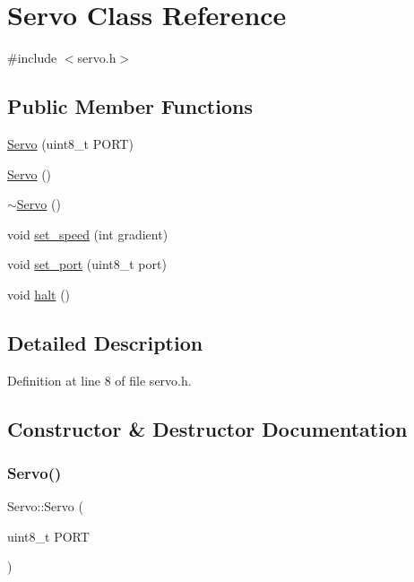 \hypertarget{class_servo}{}\section{Servo Class Reference}
\label{class_servo}


{\ttfamily \#include $<$servo.\+h$>$}

\subsection*{Public Member Functions}
\begin{DoxyCompactItemize}
\item 
\mbox{\hyperlink{class_servo_a55cadfeaac34e6efa14bc03a9b6a82c7}{Servo}} (uint8\+\_\+t P\+O\+RT)
\item 
\mbox{\hyperlink{class_servo_a70b2b17657cf258cdcb57503bcf62cd2}{Servo}} ()
\item 
\mbox{\hyperlink{class_servo_acb51bf4d970b071741ba76349a431fb0}{$\sim$\+Servo}} ()
\item 
void \mbox{\hyperlink{class_servo_aecca91f485fc36404ce8cdfcb95f0527}{set\+\_\+speed}} (int gradient)
\item 
void \mbox{\hyperlink{class_servo_a9986e323bf68602b56654a4eb44c683c}{set\+\_\+port}} (uint8\+\_\+t port)
\item 
void \mbox{\hyperlink{class_servo_a2219362602b79927b5fbd6343799f217}{halt}} ()
\end{DoxyCompactItemize}


\subsection{Detailed Description}


Definition at line 8 of file servo.\+h.



\subsection{Constructor \& Destructor Documentation}
\mbox{\label{class_servo_a55cadfeaac34e6efa14bc03a9b6a82c7}} 
\subsubsection{\texorpdfstring{Servo()}{Servo()}\hspace{0.1cm}{\footnotesize\ttfamily [1/2]}}
{\footnotesize\ttfamily Servo\+::\+Servo (\begin{DoxyParamCaption}\item[{uint8\+\_\+t}]{P\+O\+RT }\end{DoxyParamCaption})}



